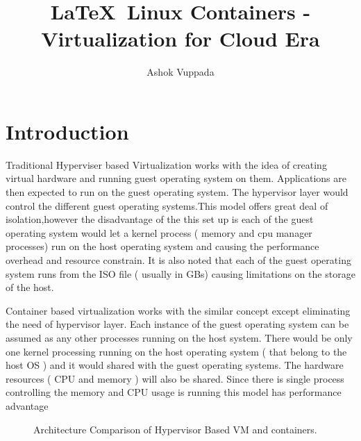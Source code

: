 \documentclass[9pt,twocolumn,twoside]{../../styles/osajnl}
\title{\LaTeX\ Linux Containers - Virtualization for  Cloud Era}
\author[1]{Ashok Vuppada}
\affil[1]{School of Informatics and Computing, Bloomington, IN 47408, U.S.A.}
\affil[*]{Corresponding authors: ashokmadhu66@gmail.com}
\begin{document}
\maketitle

\section{Introduction}

Traditional Hyperviser based Virtualization works with the idea of
creating virtual hardware and running guest operating system on
them. Applications are then expected to run on the guest operating
system. The hypervisor layer would control the different guest
operating systems.This model offers great deal of isolation,however
the disadvantage of the this set up is each of the guest operating
system would let a kernel process ( memory and cpu manager processes)
run on the host operating system and causing the performance overhead
and resource constrain. It is also noted that each of the guest
operating system runs from the ISO file ( usually in GBs) causing
limitations on the storage of the host. \cite{www-slashroot} 

Container based virtualization works with the similar concept except
eliminating the need of hypervisor layer. Each instance of the guest
operating system can be assumed as any other processes running on the
host system. There would be only one kernel processing running on the
host operating system ( that belong to the host OS ) and it would
shared with the guest operating systems. The hardware resources ( CPU
and memory ) will also be shared. Since there is single process
controlling the memory and CPU usage is running this model has
performance advantage \cite{www-slashroot}

\begin{figure}[htbp]
\centering
{}
\caption{Architecture Comparison of Hypervisor Based VM and containers.}
\label{fig:false-color}
\end{figure}
\end{document}
